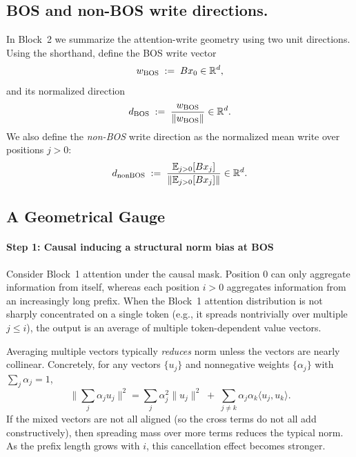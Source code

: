 \documentclass{article}
\theoremstyle{plain}
\theoremstyle{definition}
\theoremstyle{remark}
\begin{document}
\subsection{BOS and non-BOS write directions.}
In Block~2 we summarize the attention-write geometry using two unit directions.
Using the shorthand, define the BOS write vector
\begin{equation}
w_{\text{BOS}} \;:=\; Bx_0 \in \mathbb{R}^d,
\end{equation}
and its normalized direction
\begin{equation}
\label{eq:d_bos}
d_{\text{BOS}} \;:=\; \frac{w_{\text{BOS}}}{\|w_{\text{BOS}}\|} \in \mathbb{R}^d.
\end{equation}
We also define the \emph{non-BOS} write direction as the normalized mean write over positions $j>0$:
\begin{equation}
\label{eq:d_no_bos}
d_{\text{nonBOS}} \;:=\; \frac{\mathbb{E}_{j>0}[Bx_j]}{\|\mathbb{E}_{j>0}[Bx_j]\|} \in \mathbb{R}^d.
\end{equation}

\subsection{A Geometrical Gauge}
\label{subsec:mechanism}

\paragraph{Step 1: Causal inducing a structural norm bias at BOS}
\label{subsec:mech_step1}

Consider Block~1 attention under the causal mask.
Position $0$ can only aggregate information from itself, whereas each position $i>0$ aggregates information from an increasingly long prefix.
When the Block~1 attention distribution is not sharply concentrated on a single token (e.g., it spreads nontrivially over multiple $j\le i$),
the output is an average of multiple token-dependent value vectors.

Averaging multiple vectors typically \emph{reduces} norm unless the vectors are nearly collinear.
Concretely, for any vectors $\{u_j\}$ and nonnegative weights $\{\alpha_j\}$ with $\sum_j \alpha_j = 1$,
\begin{equation}
\Big\|\sum_j \alpha_j u_j\Big\|^2
= \sum_j \alpha_j^2 \|u_j\|^2 \;+\; \sum_{j\neq k} \alpha_j\alpha_k \langle u_j,u_k\rangle.
\label{eq:avg_norm_identity}
\end{equation}
If the mixed vectors are not all aligned (so the cross terms do not all add constructively), then spreading mass over more terms reduces the typical norm.
As the prefix length grows with $i$, this cancellation effect becomes stronger.
\end{document}
